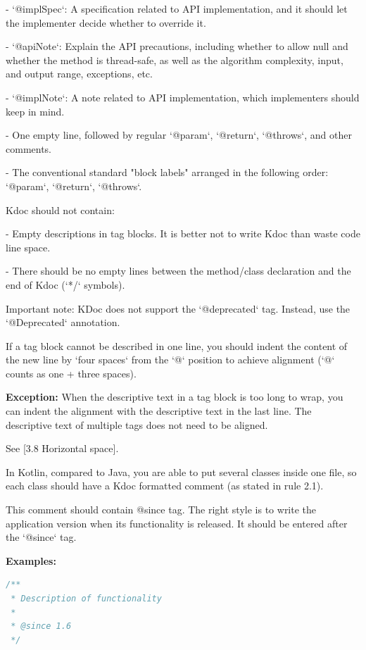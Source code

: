 - `@implSpec`: A specification related to API implementation, and it should let the implementer decide whether to override it.

- `@apiNote`: Explain the API precautions, including whether to allow null and whether the method is thread-safe, as well as the algorithm complexity, input, and output range, exceptions, etc.

- `@implNote`: A note related to API implementation, which implementers should keep in mind.

- One empty line, followed by regular `@param`, `@return`, `@throws`, and other comments.

- The conventional standard "block labels" arranged in the following order: `@param`, `@return`, `@throws`.

Kdoc should not contain:

- Empty descriptions in tag blocks. It is better not to write Kdoc than waste code line space.

- There should be no empty lines between the method/class declaration and the end of Kdoc (`*/` symbols).

Important note: KDoc does not support the `@deprecated` tag. Instead, use the `@Deprecated` annotation.



If a tag block cannot be described in one line, you should indent the content of the new line by `four spaces` from the `@` position to achieve alignment (`@` counts as one + three spaces).



\textbf{Exception:} When the descriptive text in a tag block is too long to wrap, you can indent the alignment with the descriptive text in the last line. The descriptive text of multiple tags does not need to be aligned.

See [3.8 Horizontal space].



In Kotlin, compared to Java, you are able to put several classes inside one file, so each class should have a Kdoc formatted comment (as stated in rule 2.1).

This comment should contain @since tag. The right style is to write the application version when its functionality is released. It should be entered after the `@since` tag.



\textbf{Examples:}



\begin{lstlisting}[language=Kotlin]
/**
 * Description of functionality
 *
 * @since 1.6
 */
\end{lstlisting}


